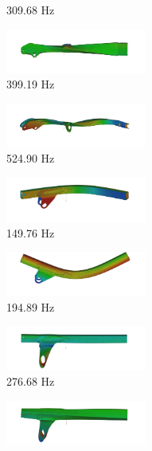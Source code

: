\begin{figure}[ht]
\begin{subfigure}{0.5\textwidth}
        \caption{309.68 Hz}
        \label{TiltSurrogate}
    \end{subfigure}
    \begin{subfigure}{0.5\textwidth} 
        \centering
        \includegraphics[width=1.82in]{LB05.png}
        \caption{399.19 Hz}
        \label{LiftSurrogate}
    \end{subfigure}%
    \begin{subfigure}{0.5\textwidth} 
        \centering
        \includegraphics[width=1.82in]{LB06.png}
        \caption{524.90 Hz}
        \label{TiltSurrogate}
    \end{subfigure}
        \begin{subfigure}{0.5\textwidth} 
        \centering
        \includegraphics[width=1.82in]{TB01.png}
        \caption{149.76 Hz}
        \label{LiftSurrogate}
    \end{subfigure}%
    \begin{subfigure}{0.5\textwidth} 
        \centering
        \includegraphics[width=1.82in]{TB02.png}
        \caption{194.89 Hz}
        \label{TiltSurrogate}
    \end{subfigure}
    \begin{subfigure}{0.5\textwidth} 
        \centering
        \includegraphics[width=1.82in]{TB03.png}
        \caption{276.68 Hz}
        \label{LiftSurrogate}
    \end{subfigure}%
    \begin{subfigure}{0.5\textwidth} 
        \centering
        \includegraphics[width=1.82in]{TB04.png}

\end{subfigure}
\end{figure}

